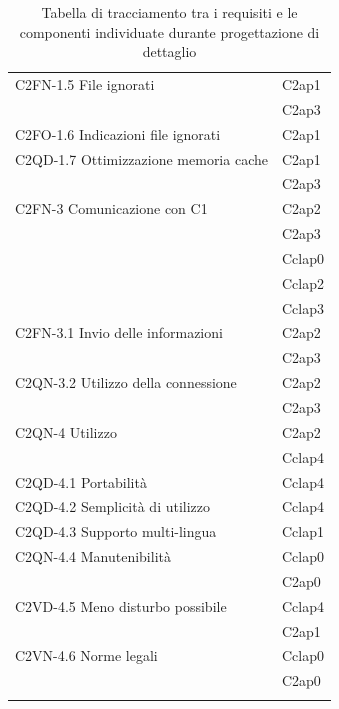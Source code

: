 \begin{footnotesize}
\begin{longtable}[!h]{|l|l|}
C2FN-1.5 File ignorati &  C2ap1\\    
&  C2ap3  \\\hline
C2FO-1.6 Indicazioni file ignorati &  C2ap1\\\hline 
C2QD-1.7 Ottimizzazione memoria cache &  C2ap1\\
&  C2ap3\\\hline
C2FN-3 Comunicazione con C1 &  C2ap2\\
&  C2ap3\\
&  Cclap0\\
&  Cclap2\\
&  Cclap3\\\hline      
C2FN-3.1 Invio delle informazioni &  C2ap2\\
&  C2ap3\\\hline
C2QN-3.2 Utilizzo della connessione &  C2ap2\\
&  C2ap3\\\hline   
C2QN-4 Utilizzo &  C2ap2\\
&  Cclap4 \\\hline  
C2QD-4.1 Portabilit\`a &  Cclap4\\\hline   
C2QD-4.2 Semplicit\`a di utilizzo  &  Cclap4\\\hline  
C2QD-4.3 Supporto multi-lingua &  Cclap1\\\hline  
C2QN-4.4 Manutenibilit\`a &  Cclap0\\
&  C2ap0\\\hline 
C2VD-4.5 Meno disturbo possibile  &  Cclap4 \\
&  C2ap1 \\\hline                          
C2VN-4.6 Norme legali &  Cclap0\\
&  C2ap0\\\hline   
\caption{Tabella di tracciamento tra i requisiti e le componenti individuate
durante progettazione di dettaglio}
\end{longtable}
\end{footnotesize}

